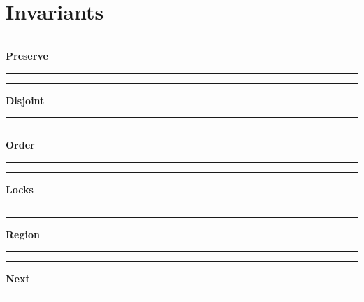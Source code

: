 





\chapter{Invariants}

\label{appendix::inv:full}

\begin{center}\rule{4cm}{0.4pt}  \textbf{Preserve}  \rule{4cm}{0.4pt}\end{center}
\label{inv::full:preserve}
\small{}

\normalsize{}


\begin{center}\rule{4cm}{0.4pt}  \textbf{Disjoint}  \rule{4cm}{0.4pt}\end{center}
\label{inv::full:disjoint}
\small{}

\normalsize{}


\begin{center}\rule{4cm}{0.4pt}  \textbf{Order}  \rule{4cm}{0.4pt}\end{center}
\label{inv::full:order}
\small{}

\normalsize{}


\begin{center}\rule{4cm}{0.4pt}  \textbf{Locks}  \rule{4cm}{0.4pt}\end{center}
\label{inv::full:lock}
\small{}

\normalsize{}


\begin{center}\rule{4cm}{0.4pt}  \textbf{Region}  \rule{4cm}{0.4pt}\end{center}
\label{inv::full:region}
\small{}

\normalsize{}


\begin{center}\rule{4cm}{0.4pt}  \textbf{Next}  \rule{4cm}{0.4pt}\end{center}
\label{inv::full:next}
\small{}

\normalsize{}


